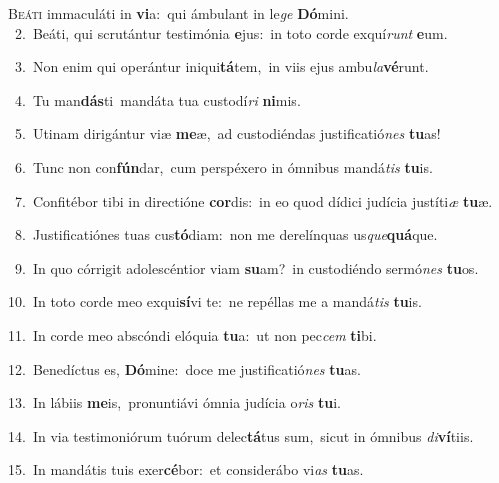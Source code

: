 \lettrine{\initial\textcolor{\initialcolor}{B}}{eáti} immaculáti in \textbf{vi}\-a:~\star qui ámbulant in le\textit{ge} \textbf{Dó}\-mini.\\
{\numbfont\textcolor{\numbcolor}{~2.}}~Beáti, qui scrutántur testimónia \textbf{e}\-jus:~\star in toto corde exquí\textit{runt} \textbf{e}\-um.\par
{\numbfont\textcolor{\numbcolor}{~3.}}~Non enim qui operántur iniqui\-\textbf{tá}\-tem,~\star in viis ejus ambu\-\textit{la}\-\textbf{vé}runt.\par
{\numbfont\textcolor{\numbcolor}{~4.}}~Tu man\-\textbf{dás}\-ti~\star mandáta tua custodí\textit{ri} \textbf{ni}\-mis.\par
{\numbfont\textcolor{\numbcolor}{~5.}}~Utinam dirigántur viæ \textbf{me}\-æ,~\star ad custodiéndas justificatió\textit{nes} \textbf{tu}\-as!\par
{\numbfont\textcolor{\numbcolor}{~6.}}~Tunc non con\-\textbf{fún}\-dar,~\star cum perspéxero in ómnibus mandá\textit{tis} \textbf{tu}\-is.\par
{\numbfont\textcolor{\numbcolor}{~7.}}~Confitébor tibi in directióne \textbf{cor}\-dis:~\star in eo quod dídici judícia justíti\textit{æ} \textbf{tu}\-æ.\par
{\numbfont\textcolor{\numbcolor}{~8.}}~Justificatiónes tuas cus\-\textbf{tó}\-diam:~\star non me derelínquas us\-\textit{que}\-\textbf{quá}que.\par
{\numbfont\textcolor{\numbcolor}{~9.}}~In quo córrigit adolescéntior viam \textbf{su}\-am?~\star in custodiéndo sermó\textit{nes} \textbf{tu}\-os.\par
{\numbfont\textcolor{\numbcolor}{10.}}~In toto corde meo exqui\-\textbf{sí}\-vi te:~\star ne repéllas me a mandá\textit{tis} \textbf{tu}\-is.\par
{\numbfont\textcolor{\numbcolor}{11.}}~In corde meo abscóndi elóquia \textbf{tu}\-a:~\star ut non pec\textit{cem} \textbf{ti}\-bi.\par
{\numbfont\textcolor{\numbcolor}{12.}}~Benedíctus es, \textbf{Dó}\-mine:~\star doce me justificatió\textit{nes} \textbf{tu}\-as.\par
{\numbfont\textcolor{\numbcolor}{13.}}~In lábiis \textbf{me}\-is,~\star pronuntiávi ómnia judícia o\textit{ris} \textbf{tu}\-i.\par
{\numbfont\textcolor{\numbcolor}{14.}}~In via testimoniórum tuórum delec\-\textbf{tá}\-tus sum,~\star sicut in ómnibus \textit{di}\-\textbf{ví}tiis.\par
{\numbfont\textcolor{\numbcolor}{15.}}~In mandátis tuis exer\-\textbf{cé}\-bor:~\star et considerábo vi\textit{as} \textbf{tu}\-as.\par
